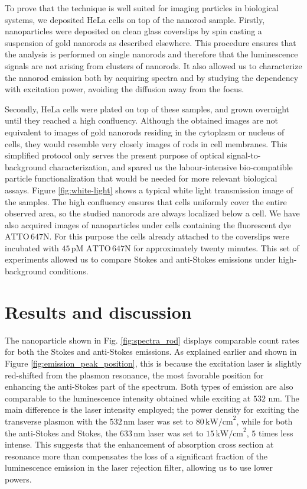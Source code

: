 \documentclass[journal=nalefd,manuscript=letter]{achemso}
\newcommand{\nm}{\ensuremath{\,\textrm{nm}}}
\newcommand{\pM}{\ensuremath{\,\textrm{pM}}}
\newcommand{\pwr}{\ensuremath{\,\textrm{kW/cm}^2}}
\newcommand{\atto}{\ensuremath{\textrm{ATTO}\,647\textrm{N}}}
\begin{document}
To prove that the technique is well suited for imaging particles in
biological systems, we deposited HeLa cells on top of the nanorod sample.
Firstly, nanoparticles were deposited on clean glass coverslips by spin casting
a suspension of gold nanorods as described elsewhere\cite{Zijlstra2011}. This
procedure ensures that the analysis is performed on single nanorods and
therefore that the luminescence signals are not arising from clusters of
nanorods. It also allowed us to characterize the nanorod emission both by
acquiring spectra and by studying the dependency with excitation power, avoiding
the diffusion away from the focus.

Secondly, HeLa cells were plated on top of these samples, and grown overnight
until they reached a high confluency. Although the obtained images are not
equivalent to images of gold nanorods residing in the cytoplasm or nucleus of
cells, they would resemble very closely images of rods in cell membranes. This
simplified protocol only serves the present purpose of optical
signal-to-background characterization, and spared us the labour-intensive
bio-compatible particle functionalization that would be needed for more relevant
biological assays. Figure \ref{fig:white-light} shows a typical white light
transmission image of the samples. The high confluency ensures that cells
uniformly cover the entire observed area, so the studied nanorods are always
localized below a cell. We have also acquired images of nanoparticles under
cells containing the fluorescent dye $\atto$. For this purpose the cells already
attached to the coverslips were incubated with $45\pM$ $\atto$ for approximately
twenty minutes. This set of experiments allowed us to compare Stokes and
anti-Stokes emissions under high-background conditions.

\section{Results and discussion}

The nanoparticle shown in Fig. \ref{fig:spectra_rod} displays comparable count
rates for both the Stokes and anti-Stokes emissions. As explained earlier and
shown in Figure \ref{fig:emission_peak_position}, this is because the excitation
laser is slightly red-shifted from the plasmon resonance, the most favorable
position for enhancing the anti-Stokes part of the spectrum. Both types of
emission are also comparable to the luminescence intensity obtained while
exciting at $532\,\nm$. The main difference is the laser intensity employed; the
power density for exciting the transverse plasmon with the $532\nm$ laser was
set to $80\pwr$, while for both the anti-Stokes and Stokes, the $633\nm$ laser
was set to $15\pwr$, $5$ times less intense. This suggests that the enhancement
of absorption cross section at resonance more than compensates the loss of a
significant fraction of the luminescence emission in the laser rejection filter,
allowing us to use lower powers.
\end{document}
